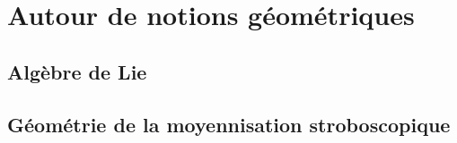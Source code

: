 \chapter{Autour de notions géométriques}

\section{Algèbre de Lie}

\section{Géométrie de la moyennisation stroboscopique}